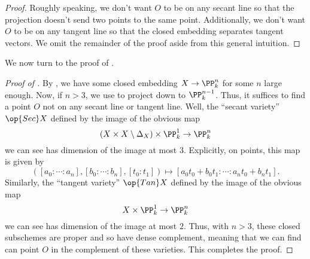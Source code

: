 \documentclass[../notes.tex]{subfiles}
\begin{document}
\begin{proof}
	Roughly speaking, we don't want $O$ to be on any secant line so that the projection doesn't send two points to the same point. Additionally, we don't want $O$ to be on any tangent line so that the closed embedding separates tangent vectors. We omit the remainder of the proof aside from this general intuition.
\end{proof}
We now turn to the proof of .
\begin{proof}[Proof of ]
	By , we have some closed embedding $X\to\PP^n_k$ for some $n$ large enough. Now, if $n>3$, we use  to project down to $\PP^{n-1}_k$. Thus, it suffices to find a point $O$ not on any secant line or tangent line. Well, the ``secant variety'' $\op{Sec}X$ defined by the image of the obvious map
	\[(X\times X\setminus\Delta_X)\times\PP^1_k\to\PP^n_k\]
	we can see has dimension of the image at most $3$. Explicitly, on points, this map is given by
	\[([a_0:\cdots:a_n],[b_0:\cdots:b_n],[t_0:t_1])\mapsto[a_0t_0+b_0t_1:\cdots:a_nt_0+b_nt_1].\]
	Similarly, the ``tangent variety'' $\op{Tan}X$ defined by the image of the obvious map
	\[X\times\PP^1_k\to\PP^n_k\]
	we can see has dimension of the image at most $2$. Thus, with $n>3$, these closed subschemes are proper and so have dense complement, meaning that we can find can point $O$ in the complement of these varieties. This completes the proof.
\end{proof}
\end{document}
